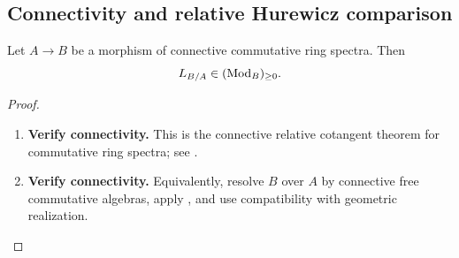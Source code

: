 \subsection{Connectivity and relative Hurewicz comparison}

\begin{proposition}
\label{prop:cotangent-connective}
Let \(A\to B\) be a morphism of connective commutative ring spectra. Then
\[
    L_{B/A}\in(\operatorname{Mod}_B)_{\geq0}.
\]
\end{proposition}

\begin{proof}
\leavevmode
\begin{enumerate}[label=\textup{(\arabic*)}]
    \item \textbf{Verify connectivity.}
    This is the connective relative cotangent theorem for commutative ring spectra; see
    \cite{LurieHigherAlgebra}.

    \item \textbf{Verify connectivity.}
    Equivalently, resolve \(B\) over \(A\) by connective free commutative algebras,
    apply , and use compatibility with geometric realization.
\end{enumerate}
\end{proof}

